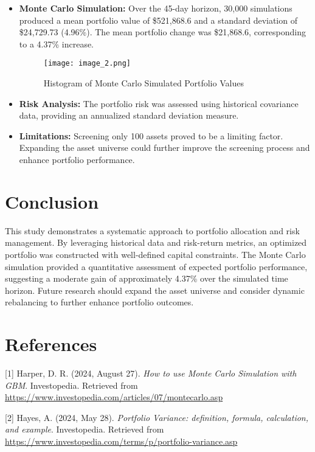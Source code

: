 \documentclass[11pt]{article}
\begin{document}
\begin{itemize}
    \item \textbf{Monte Carlo Simulation:} Over the 45-day horizon, 30,000 simulations produced a mean portfolio value of \$521,868.6 and a standard deviation of \$24,729.73 (4.96\%). The mean portfolio change was \$21,868.6, corresponding to a 4.37\% increase.
    \begin{figure}[H]
    \centering
    \texttt{[image: image\_2.png]}
    \caption{Histogram of Monte Carlo Simulated Portfolio Values}
    \label{fig:monte_carlo}
\end{figure}

    \item \textbf{Risk Analysis:} The portfolio risk was assessed using historical covariance data, providing an annualized standard deviation measure.
    \item \textbf{Limitations:} Screening only 100 assets proved to be a limiting factor. Expanding the asset universe could further improve the screening process and enhance portfolio performance.
\end{itemize}

\section{Conclusion}
This study demonstrates a systematic approach to portfolio allocation and risk management. By leveraging historical data and risk-return metrics, an optimized portfolio was constructed with well-defined capital constraints. The Monte Carlo simulation provided a quantitative assessment of expected portfolio performance, suggesting a moderate gain of approximately 4.37\% over the simulated time horizon. Future research should expand the asset universe and consider dynamic rebalancing to further enhance portfolio outcomes.

\clearpage
\section*{References}
[1] Harper, D. R. (2024, August 27). \textit{How to use Monte Carlo Simulation with GBM}. Investopedia. Retrieved from \url{https://www.investopedia.com/articles/07/montecarlo.asp}

[2] Hayes, A. (2024, May 28). \textit{Portfolio Variance: definition, formula, calculation, and example}. Investopedia. Retrieved from \url{https://www.investopedia.com/terms/p/portfolio-variance.asp}
\end{document}
